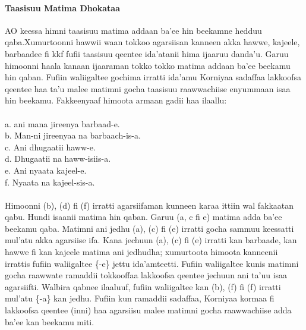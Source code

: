 \documentclass[11pt,b5paper]{book}
\begin{document}
\paragraph{Taasisuu Matima Dhokataa }
AO keessa himni taasisuu matima addaan ba’ee hin beekamne hedduu qaba.Xumurtoonni hawwii waan tokkoo agarsiisan kanneen akka hawwe, kajeele, barbaadee fi kkf fufii taasisuu qeentee ida’atanii hima ijaaruu danda’u. Garuu himoonni haala kanaan ijaaraman tokko tokko matima addaan ba’ee beekamu
hin qaban. Fufiin waliigaltee gochima irratti ida’amu Korniyaa sadaffaa lakkoofsa qeentee haa ta’u malee matimni gocha taasisuu raawwachiise enyummaan isaa hin beekamu. Fakkeenyaaf himoota armaan gadii haa ilaallu:\\
\\
a. ani mana jireenya barbaad-e.\\
b. Man-ni jireenyaa na barbaach-is-a.\\
c. Ani dhugaatii haww-e.\\
d. Dhugaatii na haww-isiis-a.\\
e. Ani nyaata kajeel-e.\\
f. Nyaata na kajeel-sis-a.\\
\\
Himoonni (b), (d) fi (f) irratti agarsiifaman kunneen karaa ittiin wal fakkaatan qabu. Hundi isaanii matima hin qaban. Garuu (a, c fi e) matima adda ba’ee beekamu qaba. Matimni ani jedhu (a), (c) fi (e) irratti gocha sammuu keessatti mul’atu akka agarsiise ifa. Kana jechuun (a), (c) fi (e) irratti kan barbaade, kan hawwe fi kan kajeele matima ani jedhudha; xumurtoota himoota kanneenii irrattis fufiin waliigaltee \{-e\} jettu ida’amteetti. Fufiin waliigaltee kunis matimni gocha raawwate ramaddii tokkooffaa lakkoofsa qeentee jechuun ani ta’uu isaa agarsiifti. Walbira qabnee ilaaluuf, fufiin waliigaltee kan (b), (f) fi (f) irratti mul’atu \{-a\} kan jedhu. Fufiin kun ramaddii sadaffaa, Korniyaa kormaa fi lakkoofsa qeentee (inni) haa agarsiisu malee matimni gocha raawwachiise adda ba’ee kan beekamu miti.
\end{document}
